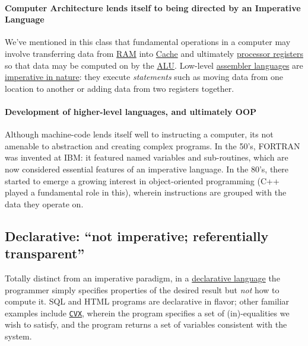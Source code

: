 \documentclass[12pt,letterpaper,twoside]{article}
\begin{document}
\paragraph{Computer Architecture lends itself to being directed by an Imperative Language} We've mentioned in this class that
fundamental operations in a computer may involve transferring data from 
\href{https://en.wikipedia.org/wiki/Random-access_memory}{RAM} into 
\href{https://en.wikipedia.org/wiki/Cache_(computing)}{Cache}
and ultimately 
\href{https://en.wikipedia.org/wiki/Processor_register}{processor registers} 
so that data may be computed on by the 
\href{https://en.wikipedia.org/wiki/Arithmetic_logic_unit}{ALU}.
Low-level \href{https://en.wikipedia.org/wiki/Assembly_language}{assembler languages} 
are \href{https://en.wikipedia.org/wiki/Imperative_programming#Rationale_and_foundations_of_imperative_programming}{imperative in nature}: they execute \emph{statements}
such as moving data from one location to another or adding data from two registers 
together.

\paragraph{Development of higher-level languages, and ultimately OOP} 
Although machine-code lends itself well to instructing
a computer, its not amenable to abstraction and creating complex programs.
In the 50's, FORTRAN was invented at IBM: it featured named variables and sub-routines,
which are now considered essential features of an imperative language.  In the 80's,
there started to emerge a growing interest in object-oriented programming 
(C++ played  a fundamental role in this), wherein instructions are grouped with the
data they operate on.

\subsection{Declarative: {\small ``not imperative; referentially transparent''}} 
Totally distinct from an imperative paradigm, in a 
\href{https://en.wikipedia.org/wiki/Declarative_programming}{declarative language} 
the programmer simply specifies properties of the desired result
but \emph{not} how to compute it. SQL and HTML programs are declarative in flavor; other familiar examples
include \href{http://cvxr.com/cvx/}{\texttt{CVX}}, 
wherein the program specifies a set of (in)-equalities we wish to satisfy, and the
program returns a set of variables consistent with the system.
\end{document}

